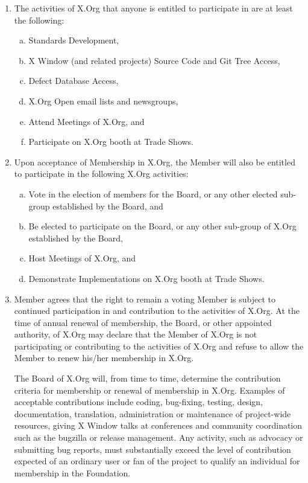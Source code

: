 \documentclass[10pt, english]{xorgdocs}
\begin{document}
\begin{enumerate}[(1)\hspace{.2cm}]
	\item The activities of X.Org that anyone is entitled to participate
	in are at least the following:

	\begin{enumerate}[(a)\hspace{.2cm}]
		\item Standards Development,
		\item X Window (and related projects) Source Code and Git
		Tree Access,
		\item Defect Database Access,
		\item X.Org Open email lists and newsgroups,
		\item Attend Meetings of X.Org, and
		\item Participate on X.Org booth at Trade Shows.
	\end{enumerate}

	\item Upon acceptance of Membership in X.Org, the Member will also be
	entitled to participate in the following X.Org activities:

	\begin{enumerate}[(a)\hspace{.2cm}]
		\item Vote in the election of members for the Board, or any
		other elected sub-group established by the Board, and
		\item Be elected to participate on the Board, or any other
		sub-group of X.Org established by the Board,
		\item Host Meetings of X.Org, and
		\item Demonstrate Implementations on X.Org booth at Trade
		Shows.
	\end{enumerate}

	\item Member agrees that the right to remain a voting Member is
	subject to continued participation in and contribution to the
	activities of X.Org. At the time of annual renewal of membership,
	the Board, or other appointed authority, of X.Org may declare that
	the Member of X.Org is not participating or contributing to the
	activities of X.Org and refuse to allow the Member to renew his/her
	membership in X.Org.

	The Board of X.Org will, from time to time, determine the contribution
	criteria for membership or renewal of membership in X.Org. Examples
	of acceptable contributions include coding, bug-fixing, testing,
	design, documentation, translation, administration or maintenance of
	project-wide resources, giving X Window talks at conferences and
	community coordination such as the bugzilla or release management.
	Any activity, such as advocacy or submitting bug reports, must
	substantially exceed the level of contribution expected of an ordinary
	user or fan of the project to qualify an individual for membership in
	the Foundation.


\end{enumerate}
\end{document}

